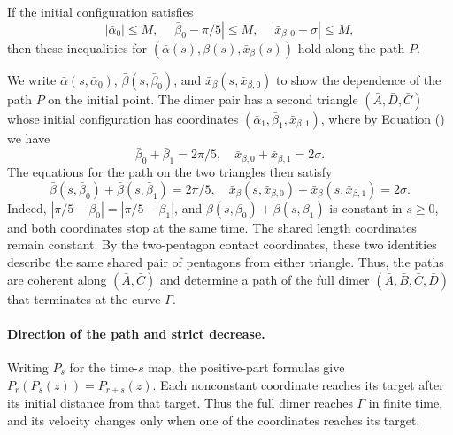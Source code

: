 If the initial configuration satisfies
\[
|\bar\alpha_0|\le M,\quad 
|\bar\beta_0-\pi/5|\le M,\quad |\bar x_{\beta,0}-\sigma|\le M,
\]
then these inequalities for $(\bar\alpha(s),\bar\beta(s),\bar
x_\beta(s))$ hold along the path $P$.

We write $\bar\alpha(s,\bar\alpha_0)$, $\bar\beta(s,\bar\beta_0)$, and
$\bar x_\beta(s,\bar x_{\beta,0})$ to show the dependence of the path
$P$ on the initial point.  The dimer pair has a second triangle $(\bar
A,\bar D,\bar C)$ whose initial configuration has coordinates
$(\bar\alpha_1,\bar\beta_1,\bar x_{\beta,1})$, where by Equation
() we have
\[
\bar\beta_0+\bar\beta_1 = 2\pi/5,\quad 
\bar x_{\beta,0}+\bar x_{\beta,1} = 2\sigma.
\]
The equations for the path on the two triangles then satisfy
\[
\bar\beta(s,\bar\beta_0)+\bar\beta(s,\bar\beta_1)=2\pi/5,\quad
\bar x_{\beta}(s,\bar x_{\beta,0}) + \bar x_{\beta}(s,\bar x_{\beta,1}) = 2\sigma.
\]
Indeed, $|\pi/5-\bar\beta_0|=|\pi/5-\bar\beta_1|$, and
$\bar\beta(s,\bar\beta_0)+\bar\beta(s,\bar\beta_1)$ is constant
in $s\ge0$, %
and both coordinates stop at the same time.
The shared
length coordinates remain constant.  By the
two-pentagon contact coordinates, these two identities describe the
same shared pair of pentagons from either triangle.  Thus, the paths
are coherent along $(\bar A,\bar C)$ and determine a path of the full
dimer $(\bar A,\bar B,\bar C,\bar D)$ that terminates at the curve
$\Gamma$.

\paragraph{Direction of the path and strict decrease.}
Writing $P_s$ for the time-$s$ map, the positive-part formulas give
$P_r(P_s(z))=P_{r+s}(z)$. Each nonconstant coordinate reaches its
target after its initial distance from that target. Thus the full
dimer reaches $\Gamma$ in finite time, and its velocity changes only
when one of the coordinates reaches its target.


